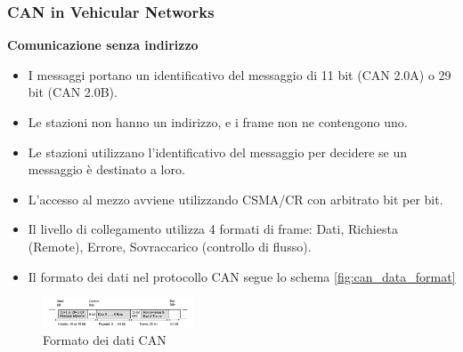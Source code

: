 \subsubsection{CAN in Vehicular Networks}
\textbf{Comunicazione senza indirizzo}
\begin{itemize}
    \item I messaggi portano un identificativo del messaggio di 11 bit (CAN 2.0A) o 29 bit (CAN 2.0B).
    \item Le stazioni non hanno un indirizzo, e i frame non ne contengono uno.
    \item Le stazioni utilizzano l'identificativo del messaggio per decidere se un messaggio è destinato a loro.
    \item L'accesso al mezzo avviene utilizzando CSMA/CR con arbitrato bit per bit.
    \item Il livello di collegamento utilizza 4 formati di frame: Dati, Richiesta (Remote), Errore, Sovraccarico (controllo di flusso).
    \item Il formato dei dati nel protocollo CAN segue lo schema \autoref{fig:can_data_format}
\end{itemize}

\begin{figure}[!ht]
  \centering
  \includegraphics[width=0.4\textwidth]{./images/can_data_format.png}
  \caption{Formato dei dati CAN}
  \label{fig:can_data_format}
\end{figure}

